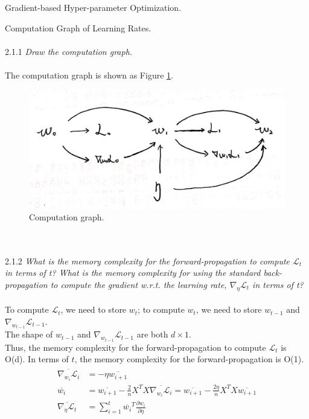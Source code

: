 \documentclass{myhw}
\begin{document}
\begin{homeworkProblem}
Gradient-based Hyper-parameter Optimization.
\begin{homeworkSection}
Computation Graph of Learning Rates. \\ \\
2.1.1 \emph{Draw the computation graph.} \\ \\
The computation graph is shown as Figure \ref{fig:2.1.1}.
\begin{figure}[h]
  \centering
  \includegraphics[width=.5\textwidth]{q2.1.1.jpeg} 
  \caption{Computation graph. }
  \label{fig:2.1.1}
\end{figure}
\\ \\
2.1.2 \emph{What is the memory complexity for the forward-propagation to compute $\mathcal{L}_t$ in terms of t? What is the memory complexity for using the standard back-propagation to compute the gradient w.r.t. the learning rate, $\nabla_{\eta} \mathcal{L}_t$ in terms of t?} \\ \\
To compute $\mathcal{L}_t$, we need to store $w_t$; 
to compute $w_t$, we need to store $w_{t-1}$ and $\nabla_{w_{t-1}} \mathcal{L}_{t-1}$. \\
The shape of $w_{t-1}$ and $\nabla_{w_{t-1}} \mathcal{L}_{t-1}$ are both $d \times 1$.\\
Thus, the memory complexity for the forward-propagation to compute $\mathcal{L}_t$ is O(d). In terms of $t$, the memory complexity for the forward-propagation is O(1). 
\begin{gather*}
\begin{aligned}
\overline{\nabla_{w_i} \mathcal{L}_i} &= - \eta \overline{w_{i+1}} \\
\overline{w_i} &= \overline{w_{i+1}} - \frac{2}{n} X^T X \overline{\nabla_{w_i} \mathcal{L}_i} 
= \overline{w_{i+1}} - \frac{2 \eta}{n} X^T X \overline{w_{i+1}} \\
\overline{\nabla_{\eta} \mathcal{L}_t} &= \sum_{i=1}^t \overline{w_i}^T \frac{\partial w_i}{\partial \eta} \\
\end{aligned}

\end{gather*}
\end{homeworkSection}
\end{homeworkProblem}
\end{document}
